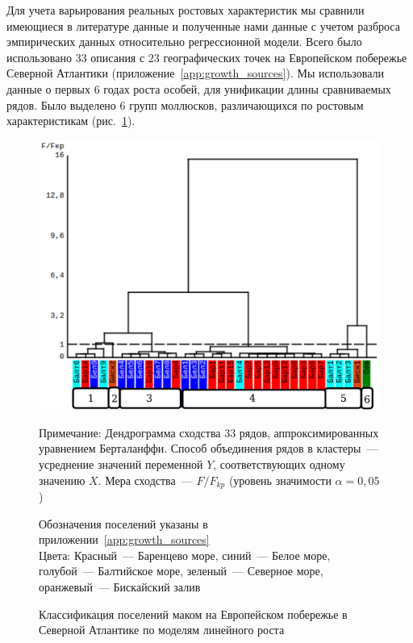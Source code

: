 Для учета варьирования реальных ростовых характеристик мы сравнили имеющиеся в литературе данные и полученные нами данные с учетом разброса эмпирических данных относительно регрессионной модели.
Всего было использовано $33$ описания с $23$ географических точек на Европейском побережье Северной Атлантики (приложение~\ref{app:growth_sources}).
Мы использовали данные о первых $6$ годах роста особей, для унификации длины сравниваемых рядов.
Было выделено $6$ групп моллюсков, различающихся по ростовым характеристикам (рис.~\ref{ris:growth_cluster_literature}).
	\begin{figure}[p]
	\begin{center}	
		\includegraphics[width=\textwidth]{../Growth_sravnenie/Europe_clusters_usrednenie.pdf}
	\end{center}
		\caption{Классификация поселений маком на Европейском побережье в Северной Атлантике по моделям линейного роста}


	\footnotesize{Примечание: Дендрограмма сходства 33 рядов, аппроксимированных уравнением Берталанффи. 
Способ объединения рядов в кластеры~--- усреднение значений переменной $Y$, соответствующих одному значению $X$.
Мера сходства~--- $F/F_{kp}$ (уровень значимости $\alpha = 0,05$)

Обозначения поселений указаны в приложении~\ref{app:growth_sources} \\
Цвета: Красный~--- Баренцево море, синий~--- Белое море, голубой~--- Балтийское море, зеленый~--- Северное море, оранжевый~--- Бискайский залив}
		\label{ris:growth_cluster_literature}
	\end{figure}


